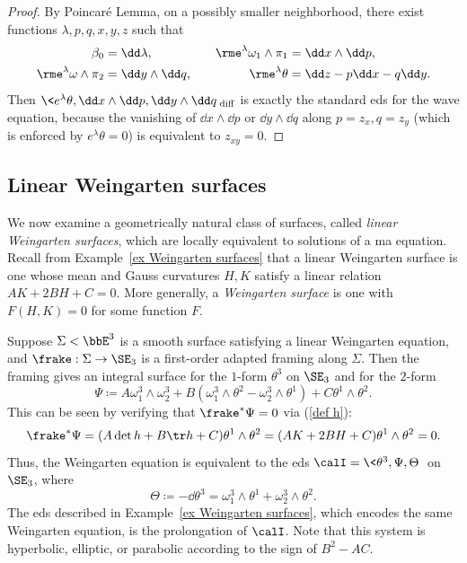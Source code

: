 \begin{proof}
    By Poincar\'e Lemma, on a possibly smaller neighborhood, there exist functions $\lambda,p,q,x,y,z$ such that 
    \begin{align}
        \beta_0&=\dd \lambda, \quad&
        \rme^{\lambda}\omega_1\wedge\pi_1&=\dd x\wedge \dd p,\\
        \rme^\lambda\omega\wedge\pi_2&=\dd y\wedge \dd q, \quad&
        \rme^\lambda\theta&=\dd z-p\dd x-q\dd y.
    \end{align}
    Then $\<e^\lambda\theta,\dd x\wedge\dd p,\dd y\wedge \dd q\>_{\mathrm{diff}}$ is exactly the standard \gls{eds} for the wave equation, because the vanishing of $\dd x\wedge\dd p$ or $\dd y\wedge \dd q$ along $p=z_x,q=z_y$ (which is enforced by $e^\lambda\theta=0$) is equivalent to $z_{xy}=0$.
\end{proof}








\subsection{Linear Weingarten surfaces}

We now examine a geometrically natural class of surfaces, called \emph{linear Weingarten surfaces}, which are locally equivalent to solutions of a \gls{ma} equation. Recall from Example~\ref{ex Weingarten surfaces} that a linear Weingarten surface is one whose mean and Gauss curvatures $H,K$ satisfy a linear relation $AK+2BH+C=0$. More generally, a \emph{Weingarten surface} is one with $F(H,K)=0$ for some function $F$.

Suppose $\Sigma <\bbE^3$ is a smooth surface satisfying a linear Weingarten equation, and $\frake:\Sigma\to \SE_3$ is a first-order adapted framing along $\Sigma$. Then the framing gives an integral surface for the $1$-form $\theta^3$ on $\SE_3$ and for the $2$-form 
\[\Psi\coloneqq A\omega_1^3 \wedge\omega_2^3+B(\omega_1^3\wedge\theta^2-\omega_2^3\wedge\theta^1)+C\theta^1\wedge\theta^2.\]
This can be seen by verifying that $\frake^\ast \Psi=0$ via (\ref{def h}):
\[\frake^\ast\Psi=(A\det h+B\tr h+C)\theta^1\wedge\theta^2=(AK+2BH+C)\theta^1\wedge\theta^2=0.\]
Thus, the Weingarten equation is equivalent to the \gls{eds} $\calI=\<\theta^3,\Psi,\Theta\>$ on $\SE_3$, where 
\[\Theta\coloneqq -\dd\theta^3=\omega_1^3\wedge\theta^1+\omega_2^3\wedge\theta^2.\]
The \gls{eds} described in Example~\ref{ex Weingarten surfaces}, which encodes the same Weingarten equation, is the prolongation of $\calI$. Note that this system is hyperbolic, elliptic, or parabolic according to the sign of $B^2-AC$.

